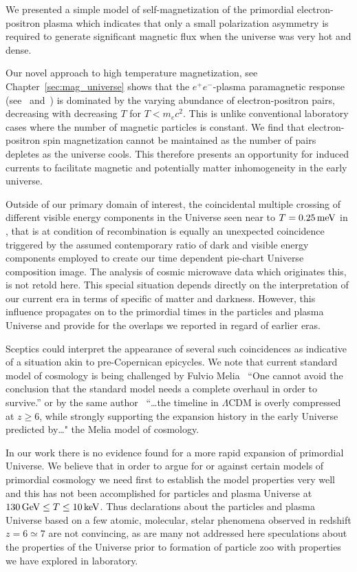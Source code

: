 We presented a simple model of self-magnetization of the primordial electron-positron plasma which indicates that only a small polarization asymmetry is required to generate significant magnetic flux when the universe was very hot and dense.

Our novel approach to high temperature magnetization, see Chapter~\ref{sec:mag_universe} shows that the $e^{+}e^{-}$-plasma paramagnetic response (see~ and~) is dominated by the varying abundance of electron-positron pairs, decreasing with decreasing $T$ for $T\!<\!m_{e}c^2$. This is unlike conventional laboratory cases where the number of magnetic particles is constant. We find that electron-positron spin magnetization cannot be maintained as the number of pairs depletes as the universe cools. This therefore presents an opportunity for induced currents to facilitate magnetic and potentially matter inhomogeneity in the early universe. 
 
Outside of our primary domain of interest, the coincidental multiple crossing of different visible energy components in the Universe seen near to $T=0.25\text{\,meV}$ in , that is at condition of recombination is equally an unexpected coincidence triggered by the assumed contemporary ratio of dark and visible energy components employed to create our time dependent pie-chart Universe composition image. The analysis of cosmic microwave data which originates this, is not retold here. This special situation depends directly on the interpretation of our current era in terms of specific of matter and darkness. However, this influence propagates on to the primordial times in the particles and plasma Universe and provide for the overlaps we reported in regard of earlier eras.

Sceptics could interpret the appearance of several such coincidences as indicative of a situation akin to pre-Copernican epicycles. We note that current standard model of cosmology is being challenged by Fulvio Melia~\cite{Melia:2022itm} ``One cannot avoid the conclusion that the standard model needs a complete overhaul in order to survive.'' or by the same author~\cite{Melia:2024rzy} ``\ldots the timeline in $\Lambda$CDM is overly compressed at $z\ge 6$, while strongly supporting the expansion history in the early Universe predicted by\ldots" the Melia model of cosmology. 

In our work there is no evidence found for a more rapid expansion of primordial Universe. We believe that in order to argue for or against certain models of primordial cosmology we need first to establish the model properties very well and this has not been accomplished for particles and plasma Universe at $130\text{\,GeV}\le T\le 10\text{\,keV}$. Thus declarations about the particles and plasma Universe based on a few atomic, molecular, stelar phenomena observed in redshift $z=6\simeq7$ are not convincing, as are many not addressed here speculations about the properties of the Universe prior to formation of particle zoo with properties we have explored in laboratory. 

